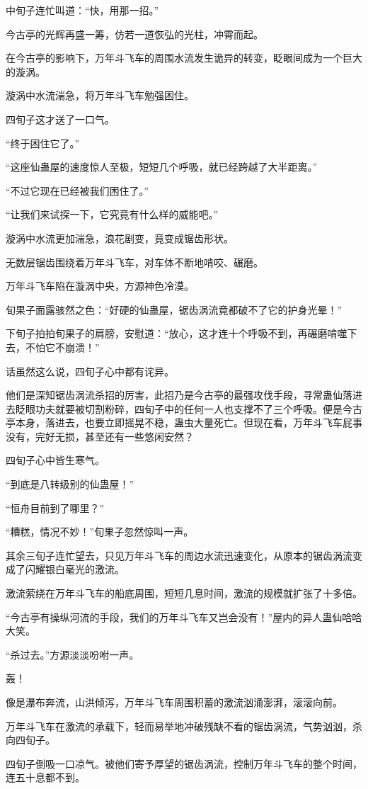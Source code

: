 \begin{this_body}
中旬子连忙叫道：“快，用那一招。”

今古亭的光辉再盛一筹，仿若一道恢弘的光柱，冲霄而起。

在今古亭的影响下，万年斗飞车的周围水流发生诡异的转变，眨眼间成为一个巨大的漩涡。

漩涡中水流湍急，将万年斗飞车勉强困住。

四旬子这才送了一口气。

“终于困住它了。”

“这座仙蛊屋的速度惊人至极，短短几个呼吸，就已经跨越了大半距离。”

“不过它现在已经被我们困住了。”

“让我们来试探一下，它究竟有什么样的威能吧。”

漩涡中水流更加湍急，浪花剧变，竟变成锯齿形状。

无数层锯齿围绕着万年斗飞车，对车体不断地啃咬、碾磨。

万年斗飞车陷在漩涡中央，方源神色冷漠。

旬果子面露骇然之色：“好硬的仙蛊屋，锯齿涡流竟都破不了它的护身光晕！”

下旬子拍拍旬果子的肩膀，安慰道：“放心，这才连十个呼吸不到，再碾磨啃噬下去，不怕它不崩溃！”

话虽然这么说，四旬子心中都有诧异。

他们是深知锯齿涡流杀招的厉害，此招乃是今古亭的最强攻伐手段，寻常蛊仙落进去眨眼功夫就要被切割粉碎，四旬子中的任何一人也支撑不了三个呼吸。便是今古亭本身，落进去，也要立即摇晃不稳，蛊虫大量死亡。但现在看，万年斗飞车屁事没有，完好无损，甚至还有一些悠闲安然？

四旬子心中皆生寒气。

“到底是八转级别的仙蛊屋！”

“恒舟目前到了哪里？”

“糟糕，情况不妙！”旬果子忽然惊叫一声。

其余三旬子连忙望去，只见万年斗飞车的周边水流迅速变化，从原本的锯齿涡流变成了闪耀银白毫光的激流。

激流萦绕在万年斗飞车的船底周围，短短几息时间，激流的规模就扩张了十多倍。

“今古亭有操纵河流的手段，我们的万年斗飞车又岂会没有！”屋内的异人蛊仙哈哈大笑。

“杀过去。”方源淡淡吩咐一声。

轰！

像是瀑布奔流，山洪倾泻，万年斗飞车周围积蓄的激流汹涌澎湃，滚滚向前。

万年斗飞车在激流的承载下，轻而易举地冲破残缺不看的锯齿涡流，气势汹汹，杀向四旬子。

四旬子倒吸一口凉气。被他们寄予厚望的锯齿涡流，控制万年斗飞车的整个时间，连五十息都不到。

\end{this_body}

